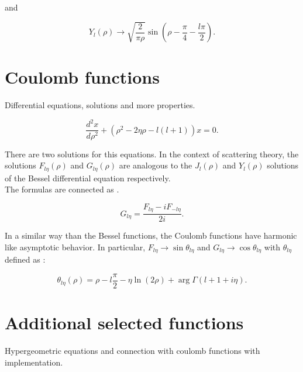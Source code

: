 \documentclass[openany]{book}
\begin{document}
and


\begin{equation} \label{eq:special_bessel_Y}
	Y_l(\rho) \rightarrow \sqrt{\frac{2}{\pi\rho}}\sin{\left(\rho - \frac{\pi}{4} - \frac{l\pi}{2}\right)}.
\end{equation}


\section{Coulomb functions} \label{sec:coulomb}

Differential equations, solutions and more properties.

\begin{equation}  \label{eq:special_coulomb_diffEquation}
	\frac{d^2x}{d\rho^2}+ (\rho^2 - 2\eta \rho  - l(l+1) )x= 0.
\end{equation}

There are two solutions for this equations. In the context of scattering theory, the solutions $F_{l\eta}(\rho)$ and $G_{l\eta}(\rho)$ are analogous to the  $J_l(\rho)$ and $Y_l(\rho)$ solutions of the Bessel differential equation respectively.  \\

The formulas are connected as \cite{gaspard_2018}.

\begin{equation}  \label{eq:special_coulomb_connection}
	G_{l\eta} = \frac{F_{l\eta} - iF_{-l\eta} }{2i}.
\end{equation}

In a similar way than the Bessel functions, the Coulomb functions have harmonic like asymptotic behavior. In particular,  $F_{l\eta} \rightarrow \sin{\theta_{l\eta}}$ and $G_{l\eta} \rightarrow \cos{\theta_{l\eta}}$ with $\theta_{l\eta}$ defined as :

\begin{equation} \label{eq:special_coulomb_theta}
	\theta_{l\eta}(\rho) = \rho -  l\frac{\pi}{2}  - \eta\ln{(2\rho)} +  \arg\Gamma(l+ 1+i\eta).
\end{equation}

\section{Additional selected functions} \label{sec:additionalFunctions}

Hypergeometric equations and connection with coulomb functions with implementation. \\
\end{document}

